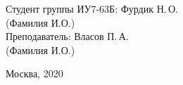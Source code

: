 \begin{titlepage}
	\begin{center}
		\newlength{\ML}
		\hfill Студент группы ИУ7-63Б:\hspace{0.2cm} Фурдик Н.\,О.\\
		\hfill\hspace{1.7cm} (Фамилия И.О.)\\
		\hfill Преподаватель:\hspace{0.2cm} Власов П.\,А.\\
		\hfill\hspace{1.7cm} (Фамилия И.О.)\\
		
	\end{center}
	
	\vspace{0pt plus4fill} %
	{\centering Москва, 2020\par}
\end{titlepage}